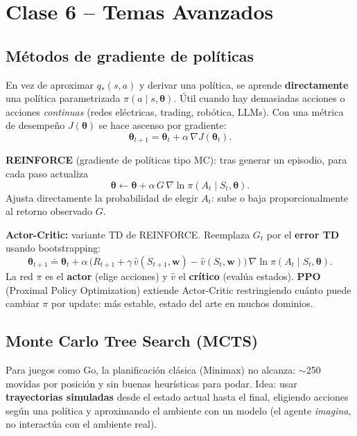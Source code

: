 \documentclass[11pt, a4paper]{article}
\begin{document}
\section{Clase 6 -- Temas Avanzados}

\subsection{M\'etodos de gradiente de pol\'iticas}
En vez de aproximar $q_*(s,a)$ y derivar una pol\'itica, se aprende \textbf{directamente} una pol\'itica parametrizada $\pi(a \mid s, \boldsymbol{\theta})$. \'Util cuando hay demasiadas acciones o acciones \emph{continuas} (redes el\'ectricas, trading, rob\'otica, LLMs). Con una m\'etrica de desempe\~no $J(\boldsymbol{\theta})$ se hace ascenso por gradiente:
\[
    \boldsymbol{\theta}_{t+1} = \boldsymbol{\theta}_t + \alpha\, \nabla J(\boldsymbol{\theta}_t).
\]

\textbf{REINFORCE} (gradiente de pol\'iticas tipo MC): tras generar un episodio, para cada paso actualiza
\[
    \boldsymbol{\theta} \leftarrow \boldsymbol{\theta} + \alpha\, G\, \nabla \ln \pi(A_t \mid S_t, \boldsymbol{\theta}).
\]
Ajusta directamente la probabilidad de elegir $A_t$: sube o baja proporcionalmente al retorno observado $G$.

\textbf{Actor-Critic:} variante TD de REINFORCE. Reemplaza $G_t$ por el \textbf{error TD} usando bootstrapping:
\[
    \boldsymbol{\theta}_{t+1} \doteq \boldsymbol{\theta}_t + \alpha\,\big(R_{t+1} + \gamma\, \hat v(S_{t+1}, \mathbf{w}) - \hat v(S_t, \mathbf{w})\big)\, \nabla \ln \pi(A_t \mid S_t, \boldsymbol{\theta}).
\]
La red $\pi$ es el \textbf{actor} (elige acciones) y $\hat v$ el \textbf{cr\'itico} (eval\'ua estados). \textbf{PPO} (Proximal Policy Optimization) extiende Actor-Critic restringiendo cu\'anto puede cambiar $\pi$ por update: m\'as estable, estado del arte en muchos dominios.

\subsection{Monte Carlo Tree Search (MCTS)}
Para juegos como Go, la planificaci\'on cl\'asica (Minimax) no alcanza: $\sim$250 movidas por posici\'on y sin buenas heur\'isticas para podar. Idea: usar \textbf{trayectorias simuladas} desde el estado actual hasta el final, eligiendo acciones seg\'un una pol\'itica y aproximando el ambiente con un modelo (el agente \emph{imagina}, no interact\'ua con el ambiente real).
\end{document}
